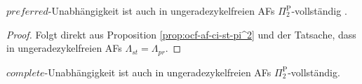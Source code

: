 \begin{Proposition}
    \label{prop:ocf-af-ci-pr-pi^2-c}
    \(preferred\)-Unabhängigkeit ist auch in ungeradezykelfreien AFs \(\Pi_2^\text{P}\)-vollständig .
\end{Proposition}

\begin{proof}
    \label{pr:ocf-af-ci-pr-pi^2-c-is-correct}
    Folgt direkt aus Proposition \ref{prop:ocf-af-ci-st-pi^2} und der Tatsache, dass in ungeradezykelfreien AFs \(\Lambda_{st} = \Lambda_{pr}\).
\end{proof}

\begin{Proposition}
    \label{prop:ocf-af-ci-co-pi^2-c}
    \(complete\)-Unabhängigkeit ist auch in ungeradezykelfreien AFs \(\Pi_2^\text{P}\)-vollständig.
\end{Proposition}


